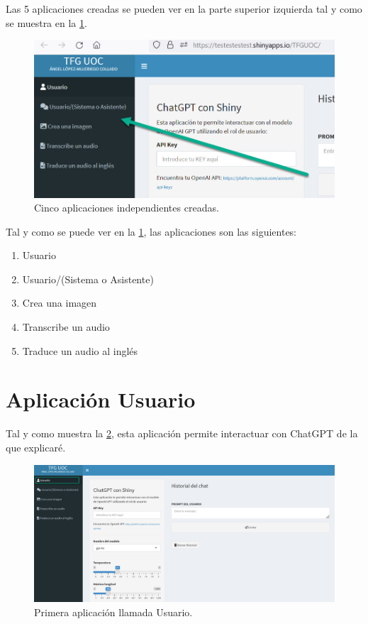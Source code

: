 \documentclass[
]{book}
\providecommand{\tightlist}{%
  \setlength{\itemsep}{0pt}\setlength{\parskip}{0pt}}
\begin{document}
Las 5 aplicaciones creadas se pueden ver en la parte superior izquierda tal y como se muestra en la \ref{fig:CURSO-2}.

\begin{figure}

{\centering \includegraphics[width=1\linewidth]{FIG3} 

}

\caption{Cinco aplicaciones independientes creadas.}\label{fig:CURSO-2}
\end{figure}

Tal y como se puede ver en la \ref{fig:CURSO-2}, las aplicaciones son las siguientes:

\begin{enumerate}
\def\labelenumi{\arabic{enumi}.}
\tightlist
\item
  Usuario
\item
  Usuario/(Sistema o Asistente)
\item
  Crea una imagen
\item
  Transcribe un audio
\item
  Traduce un audio al inglés
\end{enumerate}

\section{Aplicación Usuario}\label{aplicaciuxf3n-usuario}

Tal y como muestra la \ref{fig:CURSO-3}, esta aplicación permite interactuar con ChatGPT de la que explicaré.

\begin{figure}

{\centering \includegraphics[width=1\linewidth]{FIG4} 

}

\caption{Primera aplicación llamada Usuario.}\label{fig:CURSO-3}
\end{figure}
\end{document}
